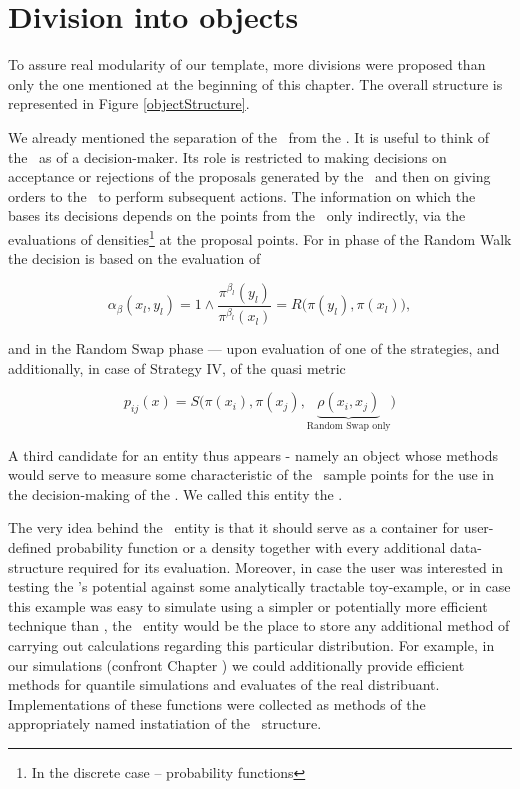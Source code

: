 \section{Division into objects}

To assure real modularity of our template, more divisions were proposed than only the one mentioned at the beginning of this chapter. The overall structure is represented in Figure \ref{objectStructure}.

We already mentioned the separation of the \algo\, from the \sspace. It is useful to think of the \algo\, as of a decision-maker. Its role is restricted to making decisions on acceptance or rejections of the proposals generated by the \sspace\, and then on giving orders to the \sspace\, to perform subsequent actions. The information on which the \algo\, bases its decisions depends on the points from the \sspace\, only indirectly, via the evaluations of densities\footnote{In the discrete case -- probability functions} at the proposal points. For in phase of the Random Walk the decision is based on the evaluation of 

\begin{equation*}
	\alpha_\beta(x_l , y_l) = 1 \wedge \frac{\pi^{\beta_l}(y_l)}{\pi^{\beta_l}(x_l)} = R\Big(\pi(y_l),\pi(x_l)\Big),
\end{equation*}

and in the Random Swap phase --- upon evaluation of one of the strategies, and additionally, in case of Strategy IV, of the quasi metric	

\begin{equation*}
	p_{ij}(x) = S\Big(\pi(x_i),\pi(x_j), \underbrace{\rho(x_i, x_j)}_\text{Random Swap only}\Big)
\end{equation*}

 A third candidate for an entity thus appears - namely an object whose methods would serve to measure some characteristic of the \sspace\, sample points for the use in the decision-making of the \algo. We called this entity the \measure. 

The very idea behind the \measure\, entity is that it should serve as a container for user-defined probability function or a density together with every additional data-structure required for its evaluation. Moreover, in case the user was interested in testing the \PTalgo's potential against some analytically tractable toy-example, or in case this example was easy to simulate using a simpler or potentially more efficient technique than \mcmc, the \measure\,
 entity would be the place to store any additional method of carrying out calculations regarding this particular distribution. For example, in our simulations (confront Chapter ) we could  additionally provide efficient methods for quantile simulations and evaluates of the real distribuant. Implementations of these functions were collected as methods of the appropriately named instatiation of the \measure\, structure.  



